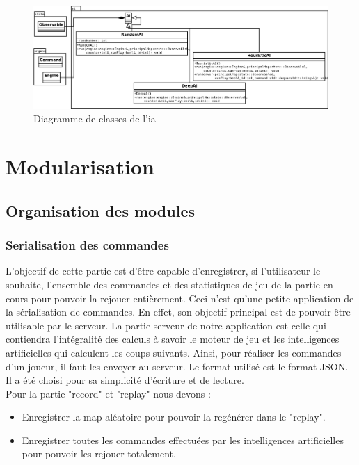 \documentclass[12pt,a4paper]{article}
\begin{document}
\begin{figure}[!ht]
\centering
    \includegraphics[width=1\textwidth]{ressources/ai.png}
     \caption{Diagramme de classes de l'ia}
\end{figure}

\newpage

\section{Modularisation}

\subsection{Organisation des modules}

\subsubsection{Serialisation des commandes}
L'objectif de cette partie est d'être capable d'enregistrer, si l'utilisateur le souhaite, l'ensemble des commandes et des statistiques de jeu de la partie en cours pour pouvoir la rejouer entièrement. Ceci n'est qu'une petite application de la sérialisation de commandes. En effet, son objectif principal est de pouvoir être utilisable par le serveur. La partie serveur de notre application est celle qui contiendra l'intégralité des calculs à savoir le moteur de jeu et les intelligences artificielles qui calculent les coups suivants. Ainsi, pour réaliser les commandes d'un joueur, il faut les envoyer au serveur. Le format utilisé est le format JSON. Il a été choisi pour sa simplicité d'écriture et de lecture. \\
Pour la partie "record" et "replay" nous devons :
\begin{itemize}
    \item Enregistrer la map aléatoire pour pouvoir la regénérer dans le "replay".
    \item Enregistrer toutes les commandes effectuées par les intelligences artificielles pour pouvoir les rejouer totalement.
\end{itemize}
\end{document}
